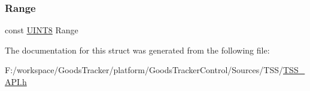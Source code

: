 \mbox{\label{struct_t_s_s___c_s_a_rotary_ac3bbfb6603540e32d0c07254344b524c}} 
\subsubsection{\texorpdfstring{Range}{Range}}
{\footnotesize\ttfamily const \hyperlink{_t_s_s___data_types_8h_ab27e9918b538ce9d8ca692479b375b6a}{U\+I\+N\+T8} Range}



The documentation for this struct was generated from the following file\+:\begin{DoxyCompactItemize}
\item 
F\+:/workspace/\+Goods\+Tracker/platform/\+Goods\+Tracker\+Control/\+Sources/\+T\+S\+S/\hyperlink{_t_s_s___a_p_i_8h}{T\+S\+S\+\_\+\+A\+P\+I.\+h}\end{DoxyCompactItemize}
